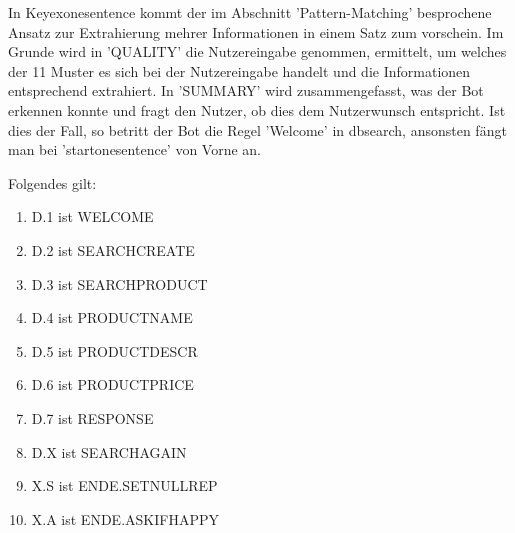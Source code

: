 In Keyexonesentence kommt der im Abschnitt 'Pattern-Matching' besprochene Ansatz zur Extrahierung mehrer Informationen in einem Satz zum vorschein. 
Im Grunde wird in 'QUALITY' die Nutzereingabe genommen, ermittelt, um welches der 11 Muster es sich bei der Nutzereingabe handelt und die Informationen entsprechend extrahiert. 
In 'SUMMARY' wird zusammengefasst, was der Bot erkennen konnte und fragt den Nutzer, ob dies dem Nutzerwunsch entspricht. Ist dies der Fall, so betritt der Bot die Regel 'Welcome' in dbsearch, ansonsten fängt man bei 'startonesentence' von Vorne an. 

\begin{center}
\end{center}

Folgendes gilt: 

\begin{enumerate}
\item{D.1 ist WELCOME}
\item{D.2 ist SEARCHCREATE}
\item{D.3 ist SEARCHPRODUCT}
\item{D.4 ist PRODUCTNAME}
\item{D.5 ist PRODUCTDESCR}
\item{D.6 ist PRODUCTPRICE}
\item{D.7 ist RESPONSE}
\item{D.X ist SEARCHAGAIN}
\item{X.S ist ENDE.SETNULLREP}
\item{X.A ist ENDE.ASKIFHAPPY}
\end{enumerate}

